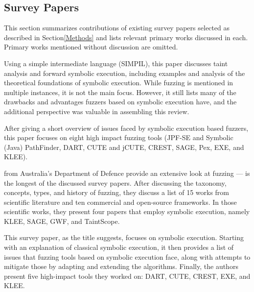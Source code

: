 \documentclass{article}
\begin{document}
\begin{multicols}{2}
    \section{Survey Papers}
    \label{SurveyPapers}

    This section summarizes contributions of existing survey papers selected as described in Section\ref{Methods} and lists relevant primary works discussed in each. Primary works mentioned without discussion are omitted.

    Using a simple intermediate language (SIMPIL), this paper discusses taint analysis and forward symbolic execution, including examples and analysis of the theoretical foundations of symbolic execution. While fuzzing is mentioned in multiple instances, it is not the main focus. However, it still lists many of the drawbacks and advantages fuzzers based on symbolic execution have, and the additional perspective was valuable in assembling this review.

    After giving a short overview of issues faced by symbolic execution based fuzzers, this paper focuses on eight high impact fuzzing tools (JPF-SE and Symbolic (Java) PathFinder\cite{JPFSE, JavaPathFinder}, DART\cite{DART}, CUTE\cite{CUTE} and jCUTE\cite{ExplicitPathModelChecking}, CREST\cite{CREST}, SAGE\cite{SAGE}, Pex\cite{Pex}, EXE\cite{EXE}, and KLEE\cite{KLEE}).

    \citeauthor{FuzzingTheStateOfTheArt} from Australia's Department of Defence provide an extensive look at fuzzing —  is the longest of the discussed survey papers. After discussing the taxonomy, concepts, types, and history of fuzzing, they discuss a list of 15 works from scientific literature and ten commercial and open-source frameworks. In those scientific works, they present four papers that employ symbolic execution, namely KLEE\cite{KLEE}, SAGE\cite{SAGE}, GWF\cite{GWF}, and TaintScope\cite{TaintScope}.

    This survey paper, as the title suggests, focuses on symbolic execution. Starting with an explanation of classical symbolic execution, it then provides a list of issues that fuzzing tools based on symbolic execution face, along with attempts to mitigate those by adapting and extending the algorithms. Finally, the authors present five high-impact tools they worked on: DART\cite{DART}, CUTE\cite{CUTE}, CREST\cite{CREST}, EXE\cite{EXE}, and KLEE\cite{KLEE}.


\end{multicols}
\end{document}
